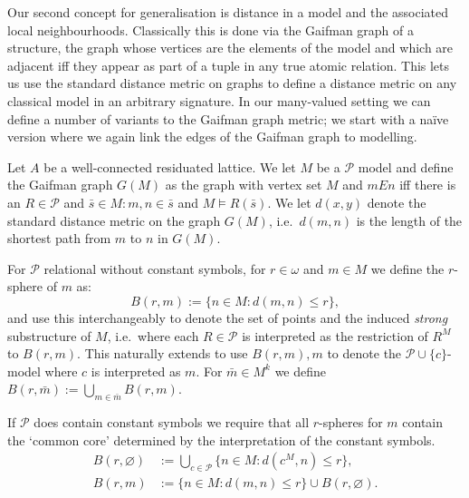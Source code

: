 \documentclass{lmcs} %
\newcommand{\?}{\ensuremath{\mkern0.4\thinmuskip}}
\newcommand{\CP}{\mathcal{P}}
\begin{document}
Our second concept for generalisation is distance in a model and the associated local neighbourhoods. Classically this is done via the Gaifman graph of a structure, the graph whose vertices are the elements of the model and which are adjacent iff they appear as part of a tuple in any true atomic relation. This lets us use the standard distance metric on graphs to define a distance metric on any classical model in an arbitrary signature. In our many-valued setting we can define a number of variants to the Gaifman graph metric; we start with a na\"{i}ve version where we again link the edges of the Gaifman graph to modelling. 
\begin{defi}\label{def:Gaifgraph}
    Let $A$ be a well-connected residuated lattice. We let $M$ be a $\CP$ model and define the Gaifman graph $G(M)$ as the graph with vertex set $M$ and $mEn$ iff there is an $R\in\CP$ and $\bar{s}\in M:m,n\in\bar{s}$ and $M\models R(\bar{s})$. We let $d(x,y)$ denote the standard distance metric on the graph $G(M)$, i.e.\ $d(m,n)$ is the length of the shortest path from $m$ to $n$ in $G(M)$. 
    
    For $\CP$ relational without constant symbols, for $r\in\omega$ and $m\in M$ we define the $r$-sphere of $m$ as:\[B(r,m):=\{n\in M:d(m,n)\leq r\},\] and use this interchangeably to denote the set of points and the induced \textit{strong} substructure of $M$, i.e.\ where each $R\in\CP$ is interpreted as the restriction of $R^M$ to $B(r,m)$. This naturally extends to use $B(r,m),m$ to denote the $\CP\cup\{c\}$-model where $c$ is interpreted as $m$. For $\bar{m}\in M^k$ we define $B(r,\bar{m}):=\bigcup\limits_{m\in\bar{m}} B(r,m)$.

    If $\CP$ does contain constant symbols we require that all $r$-spheres for $m$ contain the `common core' determined by the interpretation of the constant symbols.\begin{align*}
    B(r,\varnothing)&:=\bigcup\limits_{c\in\CP}\{n\in M:d(c^M,n)\leq r\},\\
    B(r,m)&:=\{n\in M:d(m,n)\leq r\}\cup B(r,\varnothing).
\end{align*}
\end{defi}
\end{document}
